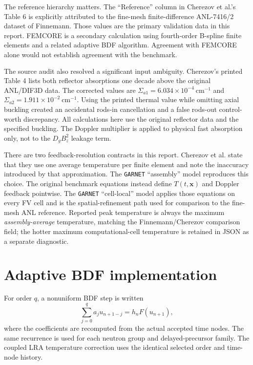 \documentclass[10pt]{article}
\newcommand{\garnet}{\texttt{GARNET}}
\begin{document}
The reference hierarchy matters. The ``Reference'' column in Cherezov et
al.'s Table 6 is explicitly attributed to the fine-mesh finite-difference
ANL-7416/2 dataset of Finnemann. Those values are the primary validation data
in this report. FEMCORE is a secondary calculation using fourth-order
B-spline finite elements and a related adaptive BDF algorithm. Agreement with
FEMCORE alone would not establish agreement with the benchmark.

The source audit also resolved a significant input ambiguity. Cherezov's
printed Table 4 lists both reflector absorptions one decade above the original
ANL/DIF3D data. The corrected values are
$\Sigma_{a1}=6.034\times10^{-4}\ \mathrm{cm}^{-1}$ and
$\Sigma_{a2}=1.911\times10^{-2}\ \mathrm{cm}^{-1}$. Using the printed thermal
value while omitting axial buckling created an accidental rods-in cancellation
and a false rods-out control-worth discrepancy. All calculations here use the
original reflector data and the specified buckling. The Doppler multiplier is
applied to physical fast absorption only, not to the $D_gB_z^2$ leakage term.

There are two feedback-resolution contracts in this report. Cherezov et al.
state that they use one average temperature per finite element and note the
inaccuracy introduced by that approximation. The \garnet{} ``assembly'' model
reproduces this choice. The original benchmark equations instead define
$T(t,\mathbf{x})$ and Doppler feedback pointwise. The \garnet{} ``cell-local''
model applies those equations on every FV cell and is the spatial-refinement
path used for comparison to the fine-mesh ANL reference. Reported peak
temperature is always the maximum \emph{assembly-average} temperature, matching
the Finnemann/Cherezov comparison field; the hotter maximum computational-cell
temperature is retained in JSON as a separate diagnostic.

\section{Adaptive BDF implementation}

For order $q$, a nonuniform BDF step is written
\begin{equation}
  \sum_{j=0}^{q} a_j u_{n+1-j}=h_n F(u_{n+1}),
\end{equation}
where the coefficients are recomputed from the actual accepted time nodes.
The same recurrence is used for each neutron group and delayed-precursor
family. The coupled LRA temperature correction uses the identical selected
order and time-node history.
\end{document}
